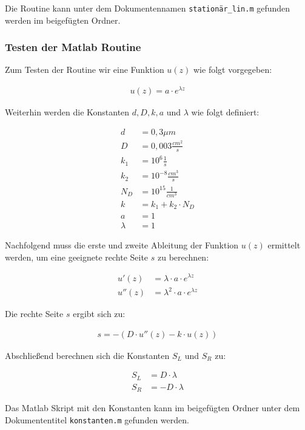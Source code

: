 \documentclass[
	pagesize,
	fontsize=12pt,
	paper=a4,
	oneside,
   reqno
]{scrartcl}
\begin{document}
Die Routine kann unter dem Dokumentennamen \texttt{stationär\_lin.m} gefunden werden im beigefügten Ordner.

\subsubsection{Testen der Matlab Routine}

Zum Testen der Routine wir eine Funktion $u(z)$ wie folgt vorgegeben:

\begin{align*}
   u(z) = a \cdot e^{\lambda z}
\end{align*}

Weiterhin werden die Konstanten $d, D, k, a$ und $\lambda$ wie folgt definiert:

\begin{align*}
   d &= 0,3\mu m \\
   D &= 0,003 \frac{cm^2}{s} \\
   k_1 &= 10^6 \frac{1}{s} \\
   k_2 &= 10^{-8} \frac{cm^3}{s} \\
   N_D &= 10^{15} \frac{1}{cm^3} \\
   k &= k_1 + k_2 \cdot N_D \\
   a &= 1 \\
   \lambda &= 1
\end{align*}

Nachfolgend muss die erste und zweite Ableitung der Funktion $u(z)$ ermittelt werden, um eine geeignete rechte Seite $s$ zu berechnen:

\begin{align*}
   u'(z) &= \lambda \cdot a \cdot e^{\lambda z} \\
   u''(z) &= \lambda^2 \cdot a \cdot e^{\lambda z}
\end{align*}

Die rechte Seite $s$ ergibt sich zu:

\begin{align*}
   s = -\left( D \cdot u''(z) - k \cdot u(z) \right)
\end{align*}

Abschließend berechnen sich die Konstanten $S_L$ und $S_R$ zu:

\begin{align*}
   S_L &= D \cdot \lambda \\
   S_R &= -D \cdot \lambda
\end{align*}

Das Matlab Skript mit den Konstanten kann im beigefügten Ordner unter dem Dokumententitel \texttt{konstanten.m} gefunden werden. \\
\end{document}
